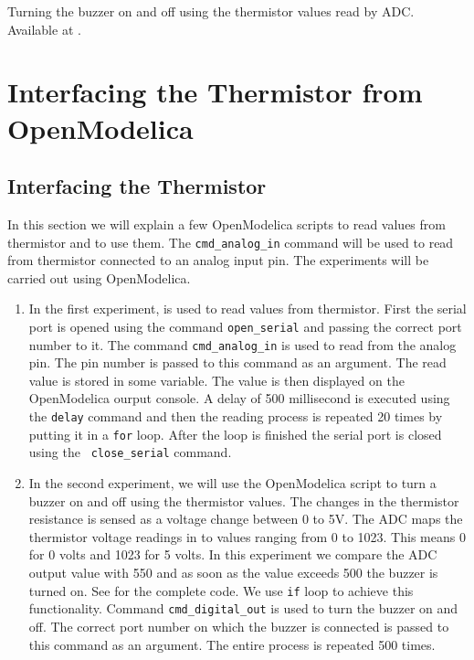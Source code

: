 \begin{juliacode}
  {Turning the buzzer on and off using the thermistor values read by
    ADC.  Available at .}
\label{julia:therm-buzzer}

\end{juliacode}

\section{Interfacing the Thermistor from OpenModelica}
\subsection{Interfacing the Thermistor}
In this section we will explain a few OpenModelica scripts to read values
from thermistor and to use them.  The {\tt cmd\_analog\_in} command
will be used to read from thermistor connected to an analog input
pin. The experiments will be carried out using OpenModelica.

\begin{enumerate}
\item In the first experiment,  is used to read
  values from thermistor. First the serial port is opened using the
  command {\tt open\_serial} and passing the correct port number to
  it. The command {\tt cmd\_analog\_in} is used to read from the
  analog pin. The pin number is passed to this command as an
  argument. The read value is stored in some variable. The value is
  then displayed on the OpenModelica ourput console. A delay of 500 millisecond is
  executed using the {\tt delay} command and then the reading process
  is repeated 20 times by putting it in a {\tt for} loop. After the
  loop is finished the serial port is closed using the {\tt
    close\_serial} command.

\item In the second experiment, we will use the OpenModelica script to
  turn a buzzer on and off using the thermistor values. The changes in
  the thermistor resistance is sensed as a voltage change between 0 to
  5V. The ADC maps the thermistor voltage readings in to values
  ranging from 0 to 1023. This means 0 for 0 volts and 1023 for 5
  volts. In this experiment we compare the ADC output value with 550
  and as soon as the value exceeds 500 the buzzer is turned on. See
   for the complete code. We use {\tt if}
  loop to achieve this functionality. Command {\tt cmd\_digital\_out}
  is used to turn the buzzer on and off.  The correct port number on
  which the buzzer is connected is passed to this command as an
  argument. The entire process is repeated 500 times.
\end{enumerate}

